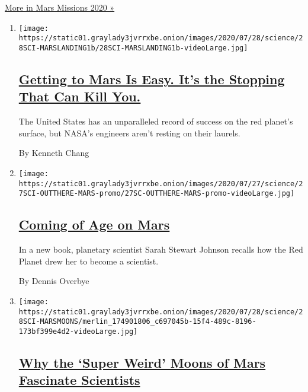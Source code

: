 \href{/news-event/summer-of-mars}{More in Mars Missions 2020 »}

\begin{enumerate}
\def\labelenumi{\arabic{enumi}.}
\item
  \texttt{[image: https://static01.graylady3jvrrxbe.onion/images/2020/07/28/science/28SCI-MARSLANDING1b/28SCI-MARSLANDING1b-videoLarge.jpg]}

  \hypertarget{getting-to-mars-is-easy-its-the-stopping-that-can-kill-you}{%
  \subsection{\texorpdfstring{\href{/2020/07/29/science/nasa-mars-perseverance-rover.html}{Getting
  to Mars Is Easy. It's the Stopping That Can Kill
  You.}}{Getting to Mars Is Easy. It's the Stopping That Can Kill You.}}\label{getting-to-mars-is-easy-its-the-stopping-that-can-kill-you}}

  The United States has an unparalleled record of success on the red
  planet's surface, but NASA's engineers aren't resting on their
  laurels.

  By Kenneth Chang
\item
  \texttt{[image: https://static01.graylady3jvrrxbe.onion/images/2020/07/27/science/27SCI-OUTTHERE-MARS-promo/27SC-OUTTHERE-MARS-promo-videoLarge.jpg]}

  \hypertarget{coming-of-age-on-mars}{%
  \subsection{\texorpdfstring{\href{/2020/07/27/science/mars-sarah-stewart-johnson.html}{Coming
  of Age on Mars}}{Coming of Age on Mars}}\label{coming-of-age-on-mars}}

  In a new book, planetary scientist Sarah Stewart Johnson recalls how
  the Red Planet drew her to become a scientist.

  By Dennis Overbye
\item
  \texttt{[image: https://static01.graylady3jvrrxbe.onion/images/2020/07/28/science/28SCI-MARSMOONS/merlin\_174901806\_c697045b-15f4-489c-8196-173bf399e4d2-videoLarge.jpg]}

  \hypertarget{why-the-super-weird-moons-of-mars-fascinate-scientists}{%
  \subsection{\texorpdfstring{\href{/2020/07/25/science/mars-moons-phobos-deimos.html}{Why
  the `Super Weird' Moons of Mars Fascinate
  Scientists}}{Why the `Super Weird' Moons of Mars Fascinate Scientists}}\label{why-the-super-weird-moons-of-mars-fascinate-scientists}}


\end{enumerate}
